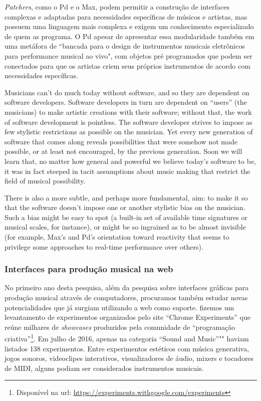 \emph{Patchers}, como o Pd e o Max, podem permitir a construção de interfaces complexas e adaptadas para necessidades específicas de músicos e artistas, mas possuem uma linguagem mais complexa e exigem um conhecimento especializado de quem as programa. O Pd apesar de apresentar essa modularidade também em uma metáfora de ``bancada para o design de instrumentos musicais eletrônicos para performance musical ao vivo", com objetos pré programados que podem ser conectados para que os artistas criem seus próprios instrumentos de acordo com necessidades específicas. \cite{PucketteMiller}
 
\begin{citacao}
Musicians can’t do much today without software, and so they are dependent on software developers. Software developers in turn are dependent on “users” (the musicians) to make artistic creations with their software; without that, the work of software development is pointless. The software developer strives to impose as few stylistic restrictions as possible on the musician. Yet every new generation of software that comes along reveals possibilities that were somehow not made possible, or at least not encouraged, by the previous generation. Soon we will learn that, no matter how general and powerful we believe today’s software to be, it was in fact steeped in tacit assumptions about music making that restrict the field of musical possibility. \cite{PucketteMiller}
\end{citacao}

\begin{citacao}
There is also a more subtle, and perhaps more fundamental, aim: to make it so that the software doesn’t impose one or another stylistic bias on the musician. Such a bias might be easy to spot (a built-in set of available time signatures or musical scales, for instance), or might be so ingrained as to be almost invisible (for example, Max’s and Pd’s orientation toward reactivity that seems to privilege some approaches to real-time performance over others).
\end{citacao}

\subsubsection{Interfaces para produção musical na web}
No primeiro ano desta pesquisa, além da pesquisa sobre interfaces gráficas para produção musical através de computadores, procuramos também estudar novas potencialidades que já surgiam utilizando a web como suporte.  fizemos um levantamento de experimentos organizados pelo site ``Chrome Experiments'' que reúne milhares de \emph{showcases} produzidos pela comunidade de ``programação criativa''\footnote{Disponível na url: \url{https://experiments.withgoogle.com/experiments}}. Em julho de 2016, apenas na categoria ``Sound and Music''""  haviam listados 138 experimentos. Entre experimentos estéticos com música generativa, jogos sonoros, videoclipes interativos, visualizadores de áudio, mixers e tocadores de MIDI, alguns podiam ser considerados instrumentos musicais. 

